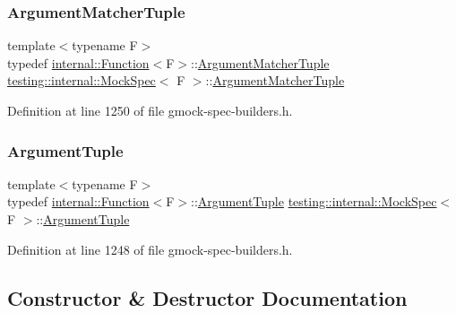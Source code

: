 \subsubsection{\texorpdfstring{Argument\+Matcher\+Tuple}{ArgumentMatcherTuple}}
{\footnotesize\ttfamily template$<$typename F$>$ \\
typedef \hyperlink{structtesting_1_1internal_1_1Function}{internal\+::\+Function}$<$F$>$\+::\hyperlink{classtesting_1_1internal_1_1MockSpec_a35dc5836483cb8c6882c365c447b26cd}{Argument\+Matcher\+Tuple} \hyperlink{classtesting_1_1internal_1_1MockSpec}{testing\+::internal\+::\+Mock\+Spec}$<$ F $>$\+::\hyperlink{classtesting_1_1internal_1_1MockSpec_a35dc5836483cb8c6882c365c447b26cd}{Argument\+Matcher\+Tuple}}



Definition at line 1250 of file gmock-\/spec-\/builders.\+h.

\mbox{\label{classtesting_1_1internal_1_1MockSpec_a7d520daca5d4d937578b4c7e8f0cf43e}} 
\subsubsection{\texorpdfstring{Argument\+Tuple}{ArgumentTuple}}
{\footnotesize\ttfamily template$<$typename F$>$ \\
typedef \hyperlink{structtesting_1_1internal_1_1Function}{internal\+::\+Function}$<$F$>$\+::\hyperlink{classtesting_1_1internal_1_1MockSpec_a7d520daca5d4d937578b4c7e8f0cf43e}{Argument\+Tuple} \hyperlink{classtesting_1_1internal_1_1MockSpec}{testing\+::internal\+::\+Mock\+Spec}$<$ F $>$\+::\hyperlink{classtesting_1_1internal_1_1MockSpec_a7d520daca5d4d937578b4c7e8f0cf43e}{Argument\+Tuple}}



Definition at line 1248 of file gmock-\/spec-\/builders.\+h.



\subsection{Constructor \& Destructor Documentation}
\mbox{\label{classtesting_1_1internal_1_1MockSpec_a067fe3d12433cec0aa63f396f4f55fa9}} 
